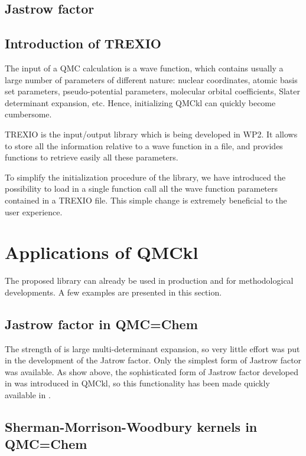\subsection{Jastrow factor}

\subsection{Introduction of TREXIO}

The input of a \ac{QMC} calculation is a wave function, which
contains usually a large number of parameters of different nature:
nuclear coordinates, atomic basis set parameters, pseudo-potential
parameters, molecular orbital coefficients, Slater determinant
expansion, etc.
Hence, initializing \ac{QMCkl} can quickly become cumbersome.

TREXIO is the input/output library which is being developed in
\ac{WP}2. It allows to store all the information relative to a wave
function in a file, and provides functions to retrieve easily all
these parameters. 

To simplify the initialization procedure of the library, we have
introduced the possibility to load in a single function call all the
wave function parameters contained in a TREXIO file. This simple
change is extremely beneficial to the user experience.


\section{Applications of QMCkl}

The proposed library can already be used in production and for
methodological developments. A few examples are presented in this section.

\subsection{Jastrow factor in QMC=Chem}

The strength of \qmcchem{} is large multi-determinant expansion, so very
little effort was put in the development of the Jatrow factor. Only the
simplest form of Jastrow factor was available. As show above, the
sophisticated form of Jastrow factor developed in \champ{} was introduced
in \ac{QMCkl}, so this functionality has been made quickly available
in \qmcchem.

\subsection{Sherman-Morrison-Woodbury kernels in QMC=Chem}

